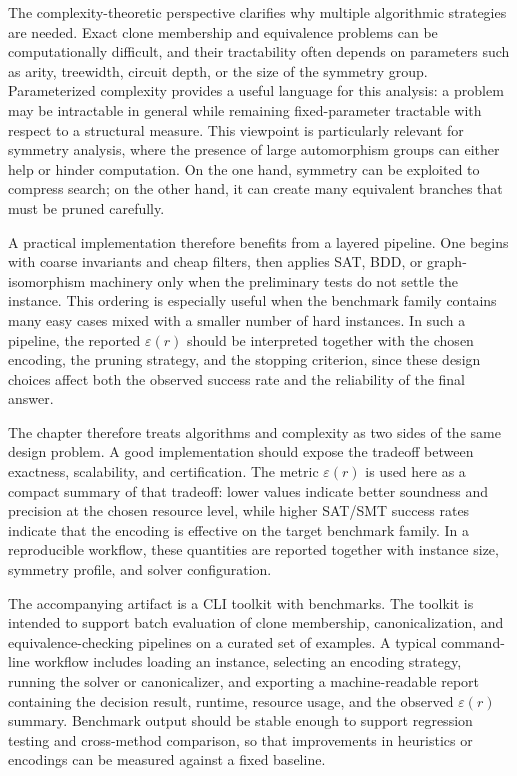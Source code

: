\documentclass[11pt]{article}
\begin{document}
The complexity-theoretic perspective clarifies why multiple algorithmic strategies are needed. Exact clone membership and equivalence problems can be computationally difficult, and their tractability often depends on parameters such as arity, treewidth, circuit depth, or the size of the symmetry group. Parameterized complexity provides a useful language for this analysis: a problem may be intractable in general while remaining fixed-parameter tractable with respect to a structural measure. This viewpoint is particularly relevant for symmetry analysis, where the presence of large automorphism groups can either help or hinder computation. On the one hand, symmetry can be exploited to compress search; on the other hand, it can create many equivalent branches that must be pruned carefully.

A practical implementation therefore benefits from a layered pipeline. One begins with coarse invariants and cheap filters, then applies SAT, BDD, or graph-isomorphism machinery only when the preliminary tests do not settle the instance. This ordering is especially useful when the benchmark family contains many easy cases mixed with a smaller number of hard instances. In such a pipeline, the reported \(\varepsilon(r)\) should be interpreted together with the chosen encoding, the pruning strategy, and the stopping criterion, since these design choices affect both the observed success rate and the reliability of the final answer.

The chapter therefore treats algorithms and complexity as two sides of the same design problem. A good implementation should expose the tradeoff between exactness, scalability, and certification. The metric \(\varepsilon(r)\) is used here as a compact summary of that tradeoff: lower values indicate better soundness and precision at the chosen resource level, while higher SAT/SMT success rates indicate that the encoding is effective on the target benchmark family. In a reproducible workflow, these quantities are reported together with instance size, symmetry profile, and solver configuration.

The accompanying artifact is a CLI toolkit with benchmarks. The toolkit is intended to support batch evaluation of clone membership, canonicalization, and equivalence-checking pipelines on a curated set of examples. A typical command-line workflow includes loading an instance, selecting an encoding strategy, running the solver or canonicalizer, and exporting a machine-readable report containing the decision result, runtime, resource usage, and the observed \(\varepsilon(r)\) summary. Benchmark output should be stable enough to support regression testing and cross-method comparison, so that improvements in heuristics or encodings can be measured against a fixed baseline.
\end{document}
